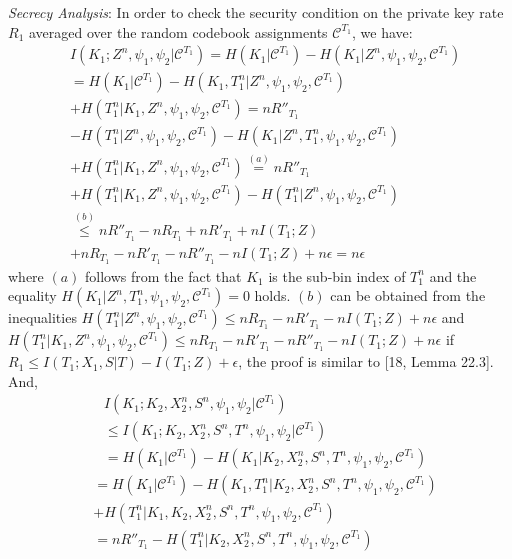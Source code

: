 \documentclass[conference,8pt]{IEEEtran}
\begin{document}
{{{{{{\emph{Secrecy Analysis}: 
In order to check the security condition on the private key rate $R_1$ averaged over the random codebook assignments $\mathcal{C}^{T_1}$, we have:
\begin{align}
&I(K_1;Z^n , \psi_1 , \psi_2|\mathcal{C}^{T_1})= H(K_1|\mathcal{C}^{T_1})-H(K_1|Z^n,\psi_1 , \psi_2,\mathcal{C}^{T_1}) \nonumber \\
&= H(K_1|\mathcal{C}^{T_1})-H(K_1,T^n_1|Z^n,\psi_1 , \psi_2,\mathcal{C}^{T_1})\nonumber \\
&+H(T^n_1|K_1,Z^n,\psi_1 , \psi_2,\mathcal{C}^{T_1})=nR''_{T_1}\nonumber \\ 
&-H(T^n_1|Z^n,\psi_1,\psi_2,\mathcal{C}^{T_1}) -H(K_1|Z^n,T^n_1,\psi_1,\psi_2,\mathcal{C}^{T_1}) \nonumber \\
&+H(T^n_1|K_1,Z^n,\psi_1 , \psi_2,\mathcal{C}^{T_1}) \stackrel{(a)}{=} nR''_{T_1}\nonumber \\
&+H(T^n_1|K_1,Z^n,\psi_1 , \psi_2,\mathcal{C}^{T_1})- H(T^n_1|Z^n,\psi_1,\psi_2,\mathcal{C}^{T_1}) \nonumber \\
&\stackrel{(b)}{\leq} nR''_{T_1}-nR_{T_1}+nR'_{T_1}+nI(T_1;Z)\nonumber \\
&+nR_{T_1}-nR'_{T_1}-nR''_{T_1}-nI(T_1;Z)+n\epsilon= n\epsilon
\end{align}where $(a)$ follows from the fact that $K_1$ is the sub-bin index of $T^n_1$ and the equality ${H(K_1|Z^n,T^n_1,\psi_1,\psi_2,\mathcal{C}^{T_1})=0}$ holds. $(b)$ can be obtained from the inequalities $H(T^n_1|Z^n,\psi_1,\psi_2,\mathcal{C}^{T_1}) \leq nR_{T_1}-nR'_{T_1}-nI(T_1;Z)+n\epsilon$ and $H(T^n_1|K_1,Z^n,\psi_1 , \psi_2,\mathcal{C}^{T_1}) \leq nR_{T_1}-nR'_{T_1}-nR''_{T_1}-nI(T_1;Z)+n\epsilon$ if $R_1 \leq I(T_1;X_1,S|T)-I(T_1;Z)+\epsilon$, the proof is similar to [18, Lemma 22.3]. And, 
\begin{align}
&I(K_1;K_2,X^n_2,S^n,\psi_1,\psi_2|\mathcal{C}^{T_1}) \nonumber \\
&\leq I(K_1;K_2,X^n_2,S^n,T^n,\psi_1,\psi_2|\mathcal{C}^{T_1}) \nonumber \\
&= H(K_1|\mathcal{C}^{T_1})-H(K_1|K_2,X^n_2,S^n,T^n,\psi_1 , \psi_2,\mathcal{C}^{T_1})\nonumber 
\end{align}
\begin{align}
&= H(K_1|\mathcal{C}^{T_1})-H(K_1,T^n_1|K_2,X^n_2,S^n,T^n,\psi_1 , \psi_2,\mathcal{C}^{T_1})\nonumber \\
&+H(T^n_1|K_1,K_2,X^n_2,S^n,T^n,\psi_1,\psi_2,\mathcal{C}^{T_1}) \nonumber \\
&=nR''_{T_1}-H(T^n_1|K_2,X^n_2,S^n,T^n,\psi_1,\psi_2,\mathcal{C}^{T_1})\nonumber \\

\end{align}}}}}}}
\end{document}
